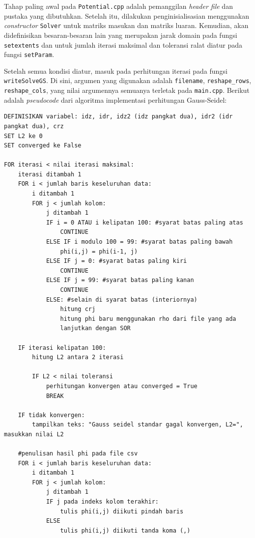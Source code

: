 Tahap paling awal pada \texttt{Potential.cpp} adalah pemanggilan \textit{header file} dan pustaka yang dibutuhkan. Setelah itu, dilakukan penginisialisasian menggunakan \textit{constructor} \texttt{Solver} untuk matriks masukan dan matriks luaran. Kemudian, akan didefinisikan besaran-besaran lain yang merupakan jarak domain pada fungsi \texttt{setextents} dan untuk jumlah iterasi maksimal dan toleransi ralat diatur pada fungsi \texttt{setParam}.

Setelah semua kondisi diatur, masuk pada perhitungan iterasi pada fungsi \texttt{writeSolveGS}. Di  sini, argumen yang digunakan adalah
\texttt{filename}, \texttt{reshape\_\texttt{\-}rows}, \texttt{reshape\_cols}, yang nilai argumennya semuanya terletak pada \texttt{main.cpp}. Berikut adalah \textit{pseudocode} dari algoritma implementasi perhitungan Gauss-Seidel:
\begin{lstlisting}[breaklines=true, breakatwhitespace=true]
DEFINISIKAN variabel: idz, idr, idz2 (idz pangkat dua), idr2 (idr pangkat dua), crz
SET L2 ke 0
SET converged ke False

FOR iterasi < nilai iterasi maksimal:
    iterasi ditambah 1
    FOR i < jumlah baris keseluruhan data:
        i ditambah 1
        FOR j < jumlah kolom:
            j ditambah 1
            IF i = 0 ATAU i kelipatan 100: #syarat batas paling atas
                CONTINUE
            ELSE IF i modulo 100 = 99: #syarat batas paling bawah
                phi(i,j) = phi(i-1, j)
            ELSE IF j = 0: #syarat batas paling kiri
                CONTINUE
            ELSE IF j = 99: #syarat batas paling kanan
                CONTINUE
            ELSE: #selain di syarat batas (interiornya)
                hitung crj
                hitung phi baru menggunakan rho dari file yang ada
                lanjutkan dengan SOR

    IF iterasi kelipatan 100:
        hitung L2 antara 2 iterasi

        IF L2 < nilai toleransi
            perhitungan konvergen atau converged = True
            BREAK

    IF tidak konvergen:
        tampilkan teks: "Gauss seidel standar gagal konvergen, L2=", masukkan nilai L2

    #penulisan hasil phi pada file csv
    FOR i < jumlah baris keseluruhan data:
        i ditambah 1
        FOR j < jumlah kolom:
            j ditambah 1
            IF j pada indeks kolom terakhir:
                tulis phi(i,j) diikuti pindah baris
            ELSE
                tulis phi(i,j) diikuti tanda koma (,)
\end{lstlisting}

